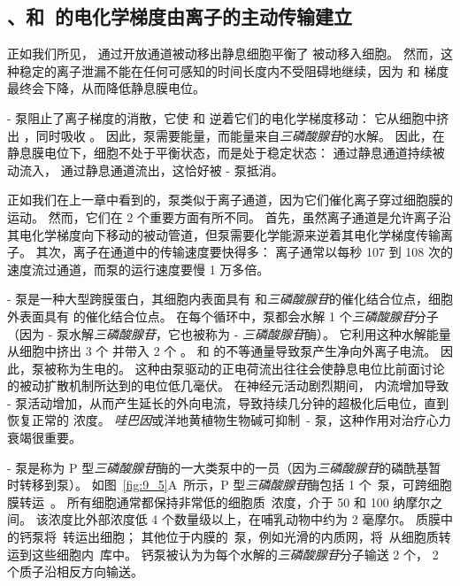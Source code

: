 \subsection{、和~的电化学梯度由离子的主动传输建立}

正如我们所见， 通过开放通道被动移出静息细胞平衡了  被动移入细胞。
然而，这种稳定的离子泄漏不能在任何可感知的时间长度内不受阻碍地继续，因为  和  梯度最终会下降，从而降低静息膜电位。


- 泵阻止了离子梯度的消散，它使  和  逆着它们的电化学梯度移动：
它从细胞中挤出 ，同时吸收 。
因此，泵需要能量，而能量来自\textit{三磷酸腺苷}的水解。
因此，在静息膜电位下，细胞不处于平衡状态，而是处于稳定状态： 通过静息通道持续被动流入， 通过静息通道流出，这恰好被 - 泵抵消。


正如我们在上一章中看到的，泵类似于离子通道，因为它们催化离子穿过细胞膜的运动。
然而，它们在 2 个重要方面有所不同。
首先，虽然离子通道是允许离子沿其电化学梯度向下移动的被动管道，但泵需要化学能源来逆着其电化学梯度传输离子。
其次，离子在通道中的传输速度要快得多：
离子通常以每秒 107 到 108 次的速度流过通道，而泵的运行速度要慢 1 万多倍。


- 泵是一种大型跨膜蛋白，其细胞内表面具有  和\textit{三磷酸腺苷}的催化结合位点，细胞外表面具有  的催化结合位点。
在每个循环中，泵都会水解 1 个\textit{三磷酸腺苷}分子（因为 - 泵水解\textit{三磷酸腺苷}，它也被称为 - \textit{三磷酸腺苷}酶）。
它利用这种水解能量从细胞中挤出 3 个  并带入 2 个 。
 和  的不等通量导致泵产生净向外离子电流。
因此，泵被称为生电的。
这种由泵驱动的正电荷流出往往会使静息电位比前面讨论的被动扩散机制所达到的电位低几毫伏。
在神经元活动剧烈期间， 内流增加导致 - 泵活动增加，从而产生延长的外向电流，导致持续几分钟的超极化后电位，直到恢复正常的  浓度。
\textit{哇巴因}或洋地黄植物生物碱可抑制~- 泵，这种作用对治疗心力衰竭很重要。


- 泵是称为 P 型\textit{三磷酸腺苷}酶的一大类泵中的一员（因为\textit{三磷酸腺苷}的磷酰基暂时转移到泵）。
如图~\ref{fig:9_5}A~所示，P 型\textit{三磷酸腺苷}酶包括 1 个~泵，可跨细胞膜转运~。
所有细胞通常都保持非常低的细胞质~浓度，介于 50 和 100 纳摩尔之间。
该浓度比外部浓度低 4 个数量级以上，在哺乳动物中约为 2 毫摩尔。
质膜中的钙泵将~转运出细胞；
其他位于内膜的~泵，例如光滑的内质网，将~从细胞质转运到这些细胞内~库中。
钙泵被认为为每个水解的\textit{三磷酸腺苷}分子输送 2 个， 2 个质子沿相反方向输送。


